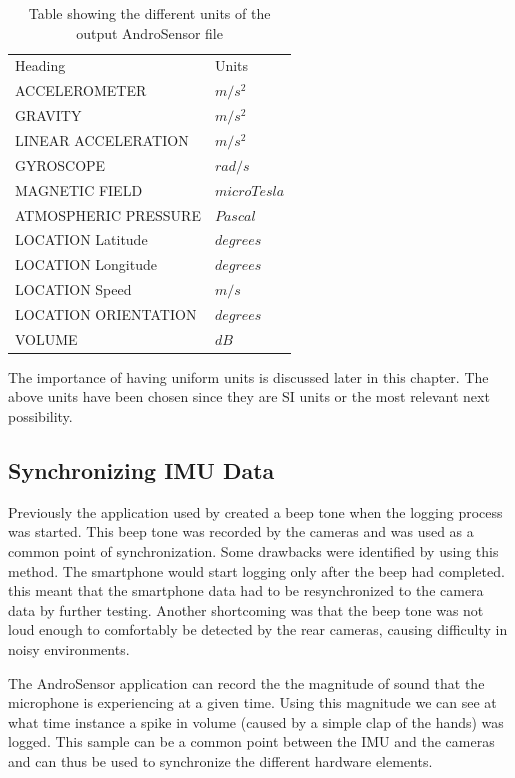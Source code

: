 \begin{table}[!ht]
\centering
\captionsetup{width=0.8\linewidth, font=small}  
\caption{Table showing the different units of the output AndroSensor file}
\label{Smartphone Data Units}
\begin{tabular}{ll}
Heading               & Units  \\
ACCELEROMETER       & $ m/s^2 $  \\
GRAVITY              & $ m/s^2 $ \\
LINEAR ACCELERATION  & $ m/s^2 $\\
GYROSCOPE            & $ rad/s $ \\
MAGNETIC FIELD       &  $  microTesla$\\
ATMOSPHERIC PRESSURE  &     $ Pascal$ \\
LOCATION Latitude     &    $ degrees $   \\
LOCATION Longitude    &    $ degrees $   \\
LOCATION Speed        &     $ m/s $  \\
LOCATION ORIENTATION  &     $ degrees $  \\
VOLUME				&		$ dB $
\end{tabular}
\end{table}

The importance of having uniform units is discussed later in this chapter. The above units have been chosen since they are SI units or the most relevant next possibility.

\subsection{Synchronizing IMU Data}
Previously the application used by \cite{bradstocks} created a beep tone when the logging process was started. This beep tone was recorded by the cameras and was used as a common point of synchronization. Some drawbacks were identified by using this method. The smartphone would start logging only after the beep had completed. this meant that the smartphone data had to be resynchronized to the camera data by further testing. Another shortcoming was that the beep tone was not loud enough to comfortably be detected by the rear cameras, causing difficulty in noisy environments.

The AndroSensor application can record the the magnitude of sound that the microphone is experiencing at a given time. Using this magnitude we can see at what time instance a spike in volume (caused by a simple clap of the hands) was logged. This sample can be a common point between the IMU and the cameras and can thus be used to synchronize the different hardware elements.

